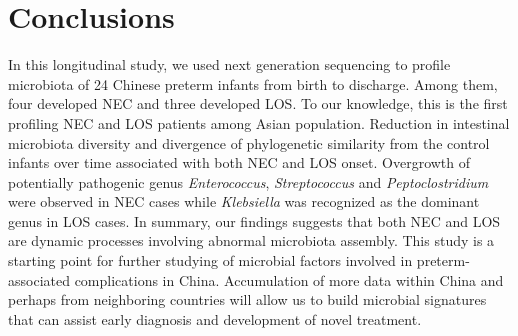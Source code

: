 \documentclass[fleqn,10pt, lineno]{wlpeerj} %
\begin{document}
\section*{Conclusions}
In this longitudinal study, we used next generation sequencing to profile microbiota of 24 Chinese preterm infants from birth to discharge.  Among them, four developed NEC and three developed LOS. To our knowledge, this is the first profiling NEC and LOS patients among Asian population. Reduction in intestinal microbiota diversity and divergence of phylogenetic similarity from the control infants over time associated with both NEC and LOS onset. Overgrowth of potentially pathogenic genus \textit{Enterococcus}, \textit{Streptococcus} and \textit{Peptoclostridium}  were observed in NEC cases while \textit{Klebsiella} was recognized as the dominant genus in LOS cases. In summary, our findings suggests that both NEC and LOS are dynamic processes involving abnormal microbiota assembly. This study is a starting point for further studying of microbial factors involved in preterm-associated complications in China. Accumulation of more data within China and perhaps from neighboring countries will allow us to build microbial signatures that can assist early diagnosis and development of novel treatment.



\end{document}
